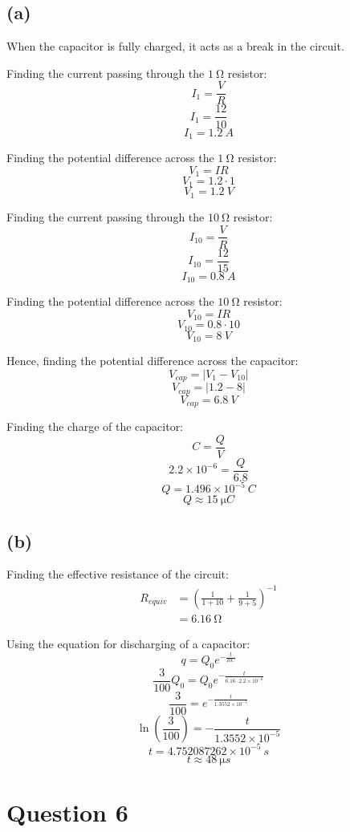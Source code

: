 \documentclass[11pt]{article}
\begin{document}
\subsection{(a)}
\label{sec:orge0b3a15}
When the capacitor is fully charged, it acts as a break in the circuit.


Finding the current passing through the \(\qty{1}{\unit{\ohm}}\) resistor:
\[I_1 = \frac{V}{R}\]
\[I_1 = \frac{12}{10}\]
\[I_1 = \qty{1.2}{\unit{A}}\]

Finding the potential difference across the \(\qty{1}{\unit{\ohm}}\) resistor:
\[V_1 = IR\]
\[V_1 = 1.2 \cdot 1\]
\[V_1 = \qty{1.2}{\unit{V}}\]

Finding the current passing through the \(\qty{10}{\unit{\ohm}}\) resistor:
\[I_{10} = \frac{V}{R}\]
\[I_{10} = \frac{12}{15}\]
\[I_{10} = \qty{0.8}{\unit{A}}\]

Finding the potential difference across the \(\qty{10}{\unit{\ohm}}\) resistor:
\[V_{10} = IR\]
\[V_{10} = 0.8 \cdot 10\]
\[V_{10} = \qty{8}{\unit{V}}\]

Hence, finding the potential difference across the capacitor:
\[V_{cap} = |V_1 - V_{10}|\]
\[V_{cap} = |1.2 - 8|\]
\[V_{cap} = \qty{6.8}{\unit{V}}\]

Finding the charge of the capacitor:
\[C = \frac{Q}{V}\]
\[2.2 \times 10^{-6} = \frac{Q}{6.8}\]
\[Q = 1.496 \times 10^{-5} \ \unit{C}\]
\[Q \approx \qty{15}{\unit{\micro C}}\]
\subsection{(b)}
\label{sec:org70c1b8f}
Finding the effective resistance of the circuit:
\begin{align*}
R_{equiv} &= \left( \frac{1}{1 + 10} + \frac{1}{9 + 5} \right)^{-1} \\
&= \qty{6.16}{\unit{\ohm}}
\end{align*}

Using the equation for discharging of a capacitor:
\[q = Q_0 e^{-\frac{t}{RC}}\]
\[\frac{3}{100} Q_0 = Q_0 e^{-\frac{t}{6.16 \cdot 2.2 \times 10^{-6}}}\]
\[\frac{3}{100} = e^{-\frac{t}{1.3552 \times 10^{-5}}}\]
\[\ln \left( \frac{3}{100} \right) = - \frac{t}{1.3552 \times 10^{-5}}\]
\[t = 4.752087262 \times 10^{-5} \ \unit{s}\]
\[t \approx \qty{48}{\unit{\micro s}}\]
\section{Question 6}
\label{sec:org35272a2}
\end{document}
